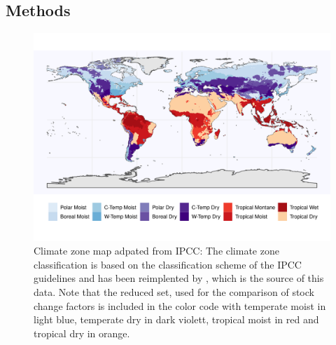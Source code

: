 \documentclass[gc, manuscript]{copernicus}
\begin{document}
\subsection{Methods}

\begin{figure}
\includegraphics[width=13cm]{../ResultNotebooks/Output/Images/climatezones} 
\caption{Climate zone map adpated from IPCC: The climate zone classification is based on the classification scheme of the IPCC guidelines \cite{eggleston_ipcc_2006} and has been reimplented by \cite{carre_background_2010}, which is the source of this data. Note that the reduced set, used for the comparison of stock change factors is included in the color code with temperate moist in light blue, temperate dry in dark violett, tropical moist in red and tropical dry in orange.}
\label{fig:CLIMzone}
\end{figure}
\end{document}
